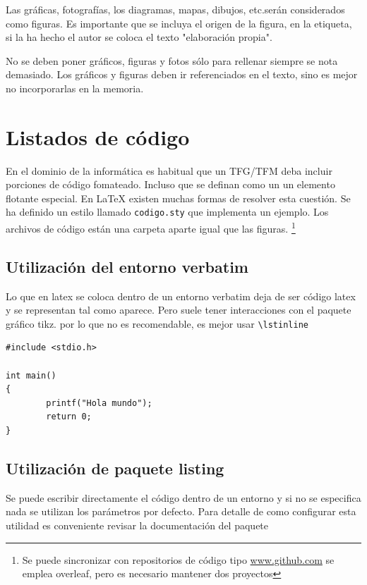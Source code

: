 Las  gráficas, fotografías,  los  diagramas,  mapas,  dibujos,  etc.serán  considerados como  figuras. Es importante que se incluya el origen de la figura, en la etiqueta, si la ha hecho el autor se coloca el texto "elaboración propia".

No se deben poner gráficos, figuras y fotos sólo para rellenar siempre se nota demasiado. Los gráficos y figuras deben ir referenciados en el texto, sino es mejor no incorporarlas en la memoria.



 \section{Listados de código}

En el dominio de la informática es habitual que un TFG/TFM deba incluir porciones de código fomateado. Incluso que se definan como un un elemento flotante especial. En \LaTeX{} existen muchas formas de resolver esta cuestión. Se ha definido un estilo llamado \lstinline[language=enparrafo]!codigo.sty! que implementa un ejemplo. Los archivos de código están una carpeta aparte igual que las figuras. \footnote{Se puede sincronizar con repositorios de código tipo \url{www.github.com} se emplea overleaf, pero es necesario mantener dos proyectos}

\subsection{Utilización del entorno verbatim}
Lo que en latex se coloca dentro de un entorno verbatim deja de ser código latex y se representan tal como aparece. Pero suele tener interacciones con el paquete  gráfico tikz. por lo que no es recomendable, es mejor usar \lstinline[language=enparrafo]!\lstinline!

\begin{verbatim}
#include <stdio.h>

int main()
{
        printf("Hola mundo");
        return 0;
}
\end{verbatim}

\subsection{Utilización de paquete listing}


Se puede escribir directamente el código dentro de un entorno y si no se especifica nada se utilizan los parámetros por defecto. Para detalle de como configurar esta utilidad es conveniente revisar la documentación del paquete

